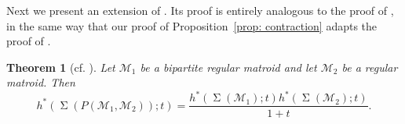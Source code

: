 \documentclass{amsart}
\numberwithin{equation}{section}
\theoremstyle{plain}
\newtheorem{thm}{Theorem}[section]
\newtheorem{lem}[thm]{Lemma}
\theoremstyle{definition}
\DeclareMathOperator{\HS}{HS}
\newcommand{\CC}{\mathbb{C}}
\newcommand{\calM}{\mathcal{M}}
\DeclareMathOperator{\SEP}{\Sigma}
\begin{document}


Next we present an extension of \cite[Theorem 44]{DDM}.
Its proof is entirely analogous to the proof of \cite[Theorem 44]{DDM}, in the same way that our proof of Proposition~\ref{prop: contraction} adapts the proof of \cite[Proposition 5.4]{OhsugiTsuchiya21}.

\begin{thm}[{cf. \cite[Theorem 44]{DDM}}]
    Let $\calM_1$ be a bipartite regular matroid and let $\calM_2$ be a regular matroid.
    Then
    \[
        h^*(\SEP(P(\calM_1,\calM_2));t) = \frac{h^*(\SEP(\calM_1);t)h^*(\SEP(\calM_2);t)}{1 + t}.
    \]
\end{thm}
\end{document}
